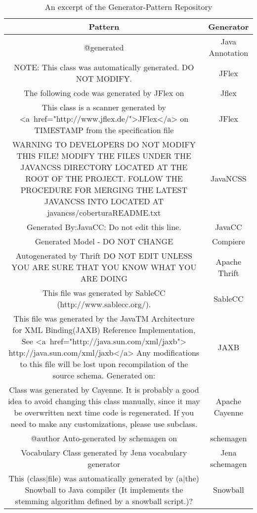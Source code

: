 \setlength{\extrarowheight}{0.2em}
\begin{table}
	\caption{An excerpt of the Generator-Pattern Repository}
	\label{table:generatorPatternRepository}
	\begin{tabularx}{\textwidth}{C|c}
		\textbf{Pattern} & \textbf{Generator} \\
		\hline
		@generated & Java Annotation \\
		NOTE: This class was automatically generated. DO NOT MODIFY. & JFlex \\
		The following code was generated by JFlex \version on \timestamp & Jflex \\
		This class is a scanner generated by <a~href="http://www.jflex.de/">JFlex</a> \version
on {{TIMESTAMP}} from the specification file & JFlex \\
		WARNING TO \project DEVELOPERS \return DO NOT MODIFY THIS FILE! \return MODIFY THE FILES UNDER THE JAVANCSS DIRECTORY LOCATED AT THE ROOT OF THE \project PROJECT. FOLLOW THE PROCEDURE FOR MERGING THE LATEST JAVANCSS INTO \project LOCATED AT javancss/coberturaREADME.txt & JavaNCSS \\
		Generated By:JavaCC: Do not edit this line. & JavaCC \\
		Generated Model - DO NOT CHANGE & Compiere \\
		Autogenerated by Thrift \return DO NOT EDIT UNLESS YOU ARE SURE THAT YOU KNOW WHAT YOU ARE DOING & Apache Thrift \\
		This file was generated by SableCC (http://www.sablecc.org/). & SableCC \\
		This file was generated by the JavaTM Architecture for XML Binding(JAXB) Reference Implementation, \version \return See <a~href="http://java.sun.com/xml/jaxb"> http://java.sun.com/xml/jaxb</a> \return Any modifications to this file will be lost upon recompilation of the source schema. Generated on: \timestamp & JAXB \\
		Class \class was generated by Cayenne. It is probably a good idea to avoid changing this class manually, since it may be overwritten next time code is regenerated. If you need to make any customizations, please use subclass. & Apache Cayenne \\
		@author Auto-generated by schemagen on \timestamp & schemagen \\
		Vocabulary Class generated by Jena vocabulary generator & Jena schemagen \\
		This (class|file) was automatically generated by (a|the) Snowball to Java compiler (\return It implements the stemming algorithm defined by a snowball script.)? & Snowball \\
		
		
		
	\end{tabularx}
\end{table}
\setlength{\extrarowheight}{0em}
